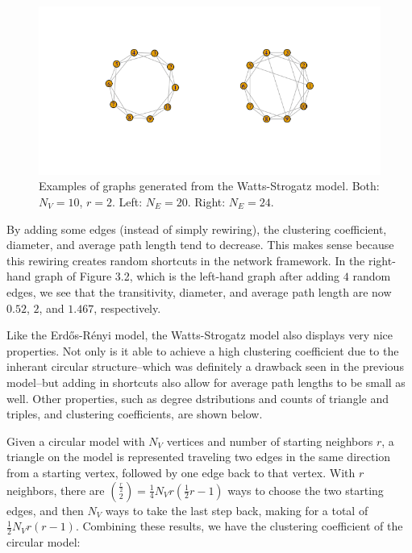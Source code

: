 \documentclass[12pt,twoside]{amherstthesis}
\begin{document}
  \begin{figure}[htbp]
  \centering
  \includegraphics{figure/22wattsstrogatzexample.png}
  \caption{Examples of graphs generated from the Watts-Strogatz model.
  Both: \(N_V = 10\), \(r = 2\). Left: \(N_E = 20\). Right: \(N_E = 24\).}
  \end{figure}
  
  By adding some edges (instead of simply rewiring), the clustering
  coefficient, diameter, and average path length tend to decrease. This
  makes sense because this rewiring creates random shortcuts in the
  network framework. In the right-hand graph of Figure 3.2, which is the
  left-hand graph after adding \(4\) random edges, we see that the
  transitivity, diameter, and average path length are now \(0.52\), \(2\),
  and \(1.467\), respectively.
  
  Like the Erdős-Rényi model, the Watts-Strogatz model also displays very
  nice properties. Not only is it able to achieve a high clustering
  coefficient due to the inherant circular structure--which was definitely
  a drawback seen in the previous model--but adding in shortcuts also
  allow for average path lengths to be small as well. Other properties,
  such as degree dstributions and counts of triangle and triples, and
  clustering coefficients, are shown below.
  
  Given a circular model with \(N_{V}\) vertices and number of starting
  neighbors \(r\), a triangle on the model is represented traveling two
  edges in the same direction from a starting vertex, followed by one edge
  back to that vertex. With \(r\) neighbors, there are
  \({\frac {r} {2} \choose 2} = \frac {1} {4} N_{V} r \left(\frac {1} {2} r - 1 \right)\)
  ways to choose the two starting edges, and then \(N_V\) ways to take the
  last step back, making for a total of \(\frac {1} {2} N_{V} r(r - 1)\).
  Combining these results, we have the clustering coefficient of the
  circular model:
  
\end{document}
